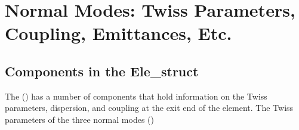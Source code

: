 \chapter{Normal Modes: Twiss Parameters, Coupling, Emittances, Etc.}
\label{c:normal.modes}

\section{Components in the Ele\_struct}
\label{s:twiss.ele}

The  () has a number of components that
hold information on the Twiss parameters, dispersion, and coupling
at the exit end of the element. The Twiss parameters of the three 
normal modes ()
